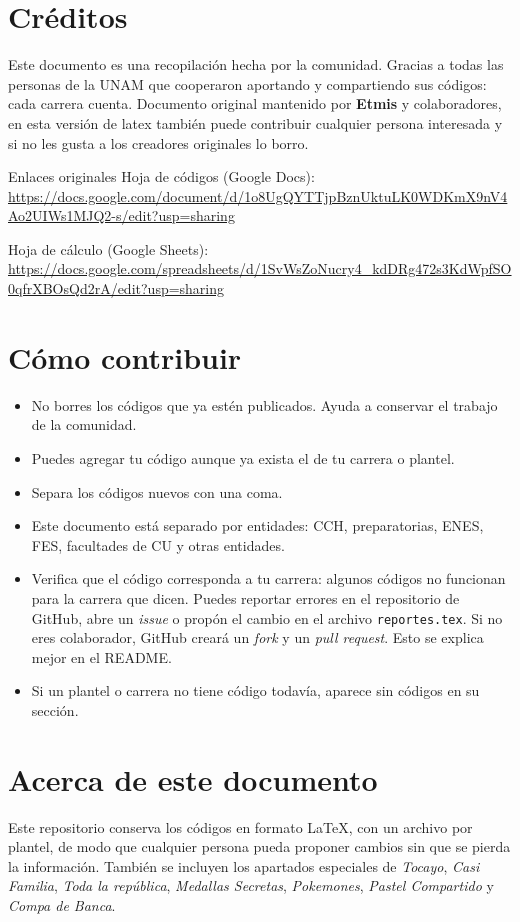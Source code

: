 \section{Créditos}
Este documento es una recopilación hecha por la comunidad. Gracias a todas las personas de la UNAM que cooperaron aportando y compartiendo sus códigos: cada carrera cuenta. Documento original mantenido por \textbf{Etmis} y colaboradores, en esta versión de latex también puede contribuir cualquier persona interesada y si no les gusta a los creadores originales lo borro.

\begin{myquote}{Enlaces originales}
Hoja de códigos (Google Docs):\\
\url{https://docs.google.com/document/d/1o8UgQYTTjpBznUktuLK0WDKmX9nV4Ao2UIWs1MJQ2-s/edit?usp=sharing}

\vspace{0.4em}
Hoja de cálculo (Google Sheets):\\
\url{https://docs.google.com/spreadsheets/d/1SvWsZoNucry4_kdDRg472s3KdWpfSO0qfrXBOsQd2rA/edit?usp=sharing}
\end{myquote}

\section{Cómo contribuir}
\begin{itemize}[leftmargin=*]
  \item No borres los códigos que ya estén publicados. Ayuda a conservar el trabajo de la comunidad.
  \item Puedes agregar tu código aunque ya exista el de tu carrera o plantel.
  \item Separa los códigos nuevos con una coma.
  \item Este documento está separado por entidades: CCH, preparatorias, ENES, FES, facultades de CU y otras entidades.
  \item Verifica que el código corresponda a tu carrera: algunos códigos no funcionan para la carrera que dicen. Puedes reportar errores en el repositorio de GitHub, abre un \emph{issue} o propón el cambio en el archivo \texttt{reportes.tex}. Si no eres colaborador, GitHub creará un \emph{fork} y un \emph{pull request}. Esto se explica mejor en el README.
  \item Si un plantel o carrera no tiene código todavía, aparece sin códigos en su sección.
\end{itemize}

\section{Acerca de este documento}
Este repositorio conserva los códigos en formato \LaTeX{}, con un archivo por plantel, de modo que cualquier persona pueda proponer cambios sin que se pierda la información. También se incluyen los apartados especiales de \emph{Tocayo}, \emph{Casi Familia}, \emph{Toda la república}, \emph{Medallas Secretas}, \emph{Pokemones}, \emph{Pastel Compartido} y \emph{Compa de Banca}.
